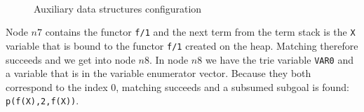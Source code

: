 \begin{figure}
   \centering
   \qquad
    \\

   \caption{Auxiliary data structures configuration}
   \label{fig:data_structs}
\end{figure}

Node $n7$ contains the functor \texttt{f/1} and the next term from the term stack is the
\texttt{X} variable that is bound to the functor \texttt{f/1} created on the heap. Matching
therefore succeeds and we get into node $n8$. In node $n8$ we have the trie variable \texttt{VAR0}
and a variable that is in the variable enumerator vector. Because they both correspond to the index 0,
matching succeeds and a subsumed subgoal is found: \texttt{p(f(X),2,f(X))}.


